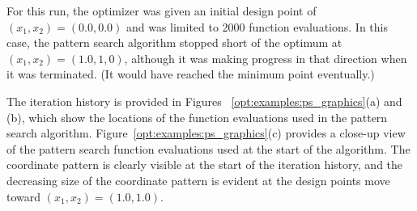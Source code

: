 For this run, the
optimizer was given an initial design point of $(x_1,x_2)
  = (0.0,0.0)$ and was limited to 2000 function evaluations. In this
case, the pattern search algorithm stopped short of the optimum at
$(x_1,x_2) = (1.0,1,0)$, although it was making progress
in that direction when it was terminated. (It would have
reached the minimum point eventually.)

The iteration history is provided in Figures~
\ref{opt:examples:ps_graphics}(a) and (b), which show
the locations of the function evaluations used in the pattern search
algorithm.
Figure~\ref{opt:examples:ps_graphics}(c)
provides a close-up view of the pattern search function evaluations
used at the start of the algorithm. The coordinate pattern is clearly
visible at the start of the iteration history, and the decreasing size
of the coordinate pattern is evident at the design points move toward
$(x_1,x_2) = (1.0,1.0)$.

